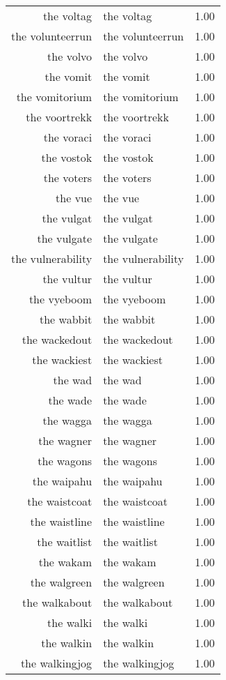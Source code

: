 \begin{table}[ht]
\begin{tabular}{rlr}
  the voltag & the voltag & 1.00 \\ 
  the volunteerrun & the volunteerrun & 1.00 \\ 
  the volvo & the volvo & 1.00 \\ 
  the vomit & the vomit & 1.00 \\ 
  the vomitorium & the vomitorium & 1.00 \\ 
  the voortrekk & the voortrekk & 1.00 \\ 
  the voraci & the voraci & 1.00 \\ 
  the vostok & the vostok & 1.00 \\ 
  the voters & the voters & 1.00 \\ 
  the vue & the vue & 1.00 \\ 
  the vulgat & the vulgat & 1.00 \\ 
  the vulgate & the vulgate & 1.00 \\ 
  the vulnerability & the vulnerability & 1.00 \\ 
  the vultur & the vultur & 1.00 \\ 
  the vyeboom & the vyeboom & 1.00 \\ 
  the wabbit & the wabbit & 1.00 \\ 
  the wackedout & the wackedout & 1.00 \\ 
  the wackiest & the wackiest & 1.00 \\ 
  the wad & the wad & 1.00 \\ 
  the wade & the wade & 1.00 \\ 
  the wagga & the wagga & 1.00 \\ 
  the wagner & the wagner & 1.00 \\ 
  the wagons & the wagons & 1.00 \\ 
  the waipahu & the waipahu & 1.00 \\ 
  the waistcoat & the waistcoat & 1.00 \\ 
  the waistline & the waistline & 1.00 \\ 
  the waitlist & the waitlist & 1.00 \\ 
  the wakam & the wakam & 1.00 \\ 
  the walgreen & the walgreen & 1.00 \\ 
  the walkabout & the walkabout & 1.00 \\ 
  the walki & the walki & 1.00 \\ 
  the walkin & the walkin & 1.00 \\ 
  the walkingjog & the walkingjog & 1.00 \\ 

\end{tabular}
\end{table}
